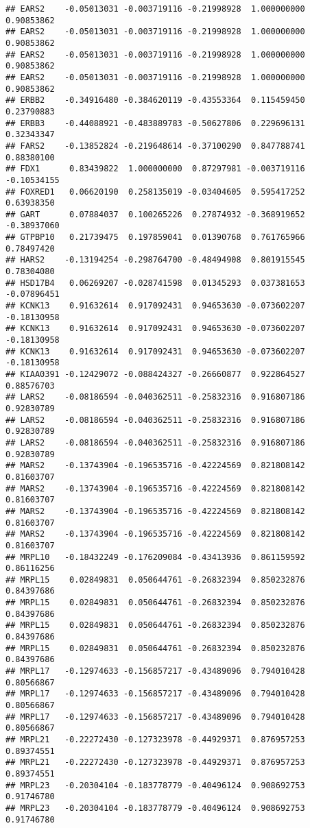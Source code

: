 \documentclass[
]{article}
\begin{document}
\begin{verbatim}
## EARS2    -0.05013031 -0.003719116 -0.21998928  1.000000000  0.90853862
## EARS2    -0.05013031 -0.003719116 -0.21998928  1.000000000  0.90853862
## EARS2    -0.05013031 -0.003719116 -0.21998928  1.000000000  0.90853862
## EARS2    -0.05013031 -0.003719116 -0.21998928  1.000000000  0.90853862
## ERBB2    -0.34916480 -0.384620119 -0.43553364  0.115459450  0.23790883
## ERBB3    -0.44088921 -0.483889783 -0.50627806  0.229696131  0.32343347
## FARS2    -0.13852824 -0.219648614 -0.37100290  0.847788741  0.88380100
## FDX1      0.83439822  1.000000000  0.87297981 -0.003719116 -0.10534155
## FOXRED1   0.06620190  0.258135019 -0.03404605  0.595417252  0.63938350
## GART      0.07884037  0.100265226  0.27874932 -0.368919652 -0.38937060
## GTPBP10   0.21739475  0.197859041  0.01390768  0.761765966  0.78497420
## HARS2    -0.13194254 -0.298764700 -0.48494908  0.801915545  0.78304080
## HSD17B4   0.06269207 -0.028741598  0.01345293  0.037381653 -0.07896451
## KCNK13    0.91632614  0.917092431  0.94653630 -0.073602207 -0.18130958
## KCNK13    0.91632614  0.917092431  0.94653630 -0.073602207 -0.18130958
## KCNK13    0.91632614  0.917092431  0.94653630 -0.073602207 -0.18130958
## KIAA0391 -0.12429072 -0.088424327 -0.26660877  0.922864527  0.88576703
## LARS2    -0.08186594 -0.040362511 -0.25832316  0.916807186  0.92830789
## LARS2    -0.08186594 -0.040362511 -0.25832316  0.916807186  0.92830789
## LARS2    -0.08186594 -0.040362511 -0.25832316  0.916807186  0.92830789
## MARS2    -0.13743904 -0.196535716 -0.42224569  0.821808142  0.81603707
## MARS2    -0.13743904 -0.196535716 -0.42224569  0.821808142  0.81603707
## MARS2    -0.13743904 -0.196535716 -0.42224569  0.821808142  0.81603707
## MARS2    -0.13743904 -0.196535716 -0.42224569  0.821808142  0.81603707
## MRPL10   -0.18432249 -0.176209084 -0.43413936  0.861159592  0.86116256
## MRPL15    0.02849831  0.050644761 -0.26832394  0.850232876  0.84397686
## MRPL15    0.02849831  0.050644761 -0.26832394  0.850232876  0.84397686
## MRPL15    0.02849831  0.050644761 -0.26832394  0.850232876  0.84397686
## MRPL15    0.02849831  0.050644761 -0.26832394  0.850232876  0.84397686
## MRPL17   -0.12974633 -0.156857217 -0.43489096  0.794010428  0.80566867
## MRPL17   -0.12974633 -0.156857217 -0.43489096  0.794010428  0.80566867
## MRPL17   -0.12974633 -0.156857217 -0.43489096  0.794010428  0.80566867
## MRPL21   -0.22272430 -0.127323978 -0.44929371  0.876957253  0.89374551
## MRPL21   -0.22272430 -0.127323978 -0.44929371  0.876957253  0.89374551
## MRPL23   -0.20304104 -0.183778779 -0.40496124  0.908692753  0.91746780
## MRPL23   -0.20304104 -0.183778779 -0.40496124  0.908692753  0.91746780

\end{verbatim}
\end{document}
